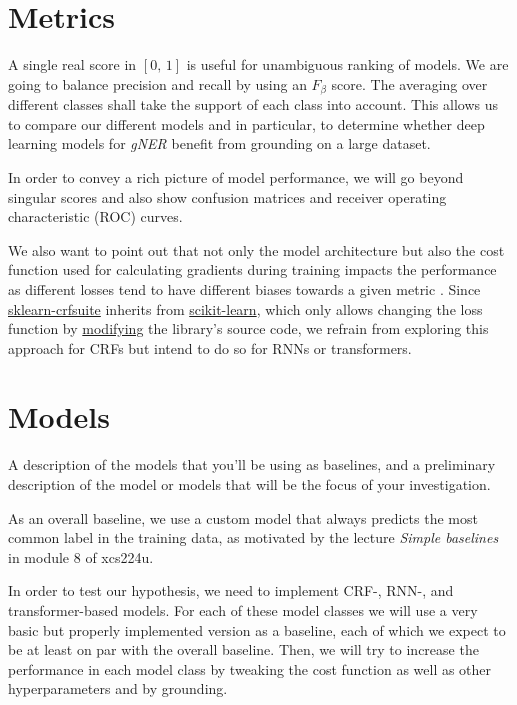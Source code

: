 \documentclass[11pt]{article}
\begin{document}
\section{Metrics}
A single real score in $\left[0,\,1\right]$ is useful for unambiguous ranking of models. We are going to balance precision and recall by using an $F_{\beta}$ score. The averaging over different classes shall take the support of each class into account. This allows us to compare our different models and in particular, to determine whether deep learning models for \emph{gNER} benefit from grounding on a large dataset. 
\par
In order to convey a rich picture of model performance, we will go beyond singular scores and also show confusion matrices and receiver operating characteristic (ROC) curves.
\par
We also want to point out that not only the model architecture but also the cost function used for calculating gradients during training impacts the performance as different losses tend to have different biases towards a given metric \citep{li-etal-2020-dice}. Since \href{https://sklearn-crfsuite.readthedocs.io/en/latest/}{sklearn-crfsuite} inherits from \href{https://scikit-learn.org/0.23/}{scikit-learn}, which only allows changing the loss function by \href{https://stackoverflow.com/questions/54267745/implementing-custom-loss-function-in-scikit-learn}{modifying} the library's source code, we refrain from exploring this approach for CRFs but intend to do so for RNNs or transformers.

\section{Models}\label{models}
A description of the models that you'll be using as baselines, and a preliminary description of the model or models that will be the focus of your investigation.
\par
As an overall baseline, we use a custom model that always predicts the most common label in the training data, as motivated by the lecture \emph{Simple baselines} in module 8 of xcs224u.  
\par
In order to test our hypothesis, we need to implement CRF-, RNN-, and transformer-based models. For each of these model classes we will use a very basic but properly implemented version as a baseline, each of which we expect to be at least on par with the overall baseline. Then, we will try to increase the performance in each model class by tweaking the cost function as well as other hyperparameters and by grounding.
\end{document}

